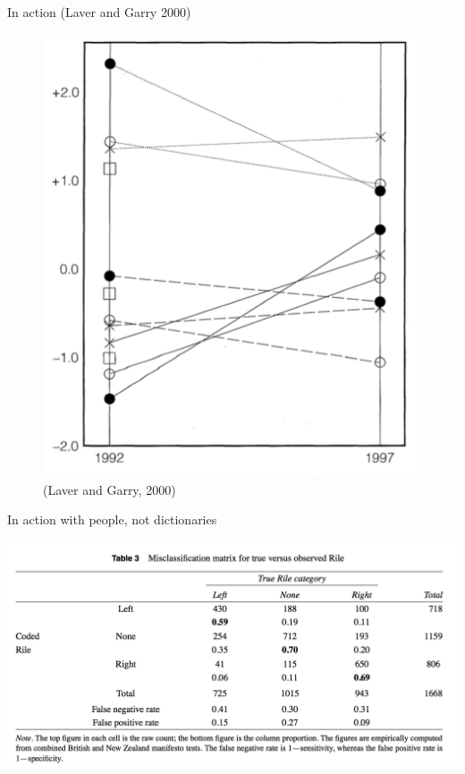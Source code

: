 \documentclass{hertieteaching}
\begin{document}
\begin{frame}{In action (Laver and Garry 2000)}
\protect\hypertarget{in-action-laver-and-garry-2000}{}

\begin{figure}

{\centering \includegraphics[width=0.5\linewidth]{pictures/lg-shrinkage} 

}

\caption{(Laver and Garry, 2000)}\label{fig:unnamed-chunk-15}
\end{figure}

\end{frame}

\begin{frame}{In action with people, not dictionaries}
\protect\hypertarget{in-action-with-people-not-dictionaries}{}

\begin{center}\includegraphics[width=0.8\linewidth]{pictures/slava-rile3} \end{center}

\end{frame}
\end{document}
